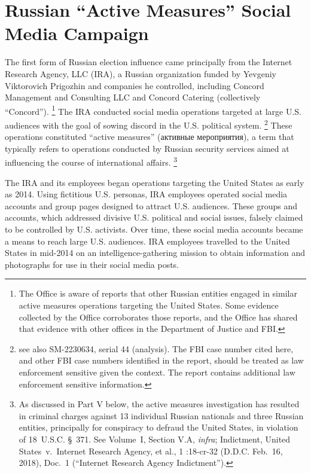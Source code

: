 \section{Russian ``Active Measures'' Social Media Campaign}

The first form of Russian election influence came principally from the Internet Research Agency, LLC (IRA), a Russian organization funded by Yevgeniy Viktorovich Prigozhin and companies he controlled, including Concord Management and Consulting LLC and Concord Catering (collectively ``Concord'').%
\footnote{The Office is aware of reports that other Russian entities engaged in similar active measures operations targeting the United States.
Some evidence collected by the Office corroborates those reports, and the Office has shared that evidence with other offices in the Department of Justice and FBI.}
The IRA conducted social media operations targeted at large U.S. audiences with the goal of sowing discord in the U.S. political system.%
\footnote{
see also SM-2230634, serial 44 (analysis).
The FBI case number cited here, and other FBI case numbers identified in the report, should be treated as law enforcement sensitive given the context.
The report contains additional law enforcement sensitive information.}
These operations constituted ``active measures'' (активные мероприятия), a term that typically refers to operations conducted by Russian security services aimed at influencing the course of international affairs.%
\footnote{As discussed in Part V below, the active measures investigation has resulted in criminal charges against 13 individual Russian nationals and three Russian entities, principally for conspiracy to defraud the United States, in violation of 18~U.S.C. \S~371.
See Volume~I, Section V.A, \textit{infra}; Indictment, United States~v.\ Internet Research Agency, et al., 1 :18-cr-32 (D.D.C. Feb.~16, 2018), Doc.~1 (``Internet Research Agency Indictment'').}

The IRA and its employees began operations targeting the United States as early as 2014.
Using fictitious U.S. personas, IRA employees operated social media accounts and group pages designed to attract U.S. audiences.
These groups and accounts, which addressed divisive U.S. political and social issues, falsely claimed to be controlled by U.S. activists.
Over time, these social media accounts became a means to reach large U.S. audiences.
IRA employees travelled to the United States in mid-2014 on an intelligence-gathering mission to obtain information and photographs for use in their social media posts.

